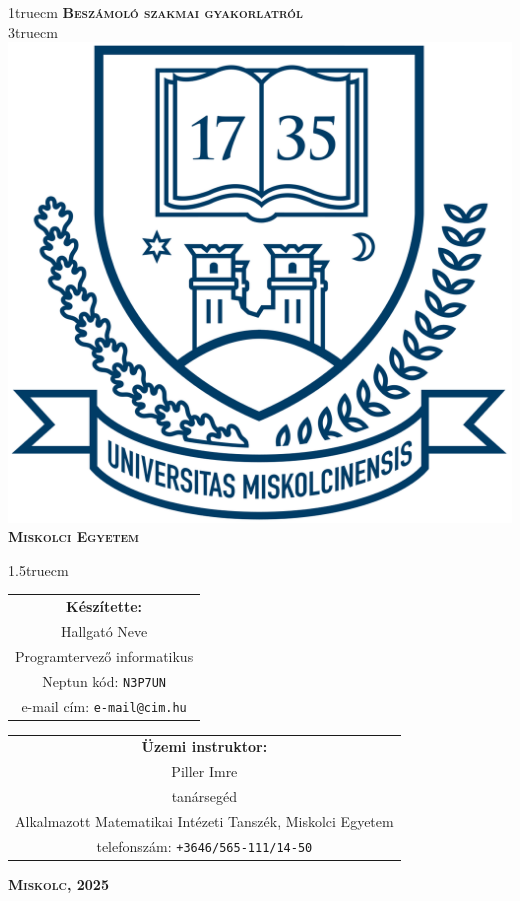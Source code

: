\pagestyle{empty} %

{\large
\begin{center}
\vglue 1truecm
\textbf{\huge\textsc{Beszámoló szakmai gyakorlatról}}\\
\vglue 3truecm
\includegraphics[width=4.8truecm, height=4truecm]{images/me_logo.png}\\
\textbf{\textsc{Miskolci Egyetem}}
\end{center}}

\vglue 1.5truecm %

{\large
\begin{center}
\begin{tabular}{c}
\textbf{Készítette:}\\
Hallgató Neve \\
Programtervező informatikus \\
Neptun kód: \texttt{N3P7UN} \\
e-mail cím: \texttt{e-mail@cim.hu}
\end{tabular}
\end{center}
\vskip 1cm
\begin{center}
\begin{tabular}{c}
\textbf{Üzemi instruktor:}\\
Piller Imre \\
tanársegéd \\
Alkalmazott Matematikai Intézeti Tanszék, Miskolci Egyetem \\
telefonszám: \texttt{+3646/565-111/14-50}


\end{tabular}
\end{center}}
\vfill
{\large
\begin{center}
\textbf{\textsc{Miskolc, 2025}}
\end{center}}

\newpage
